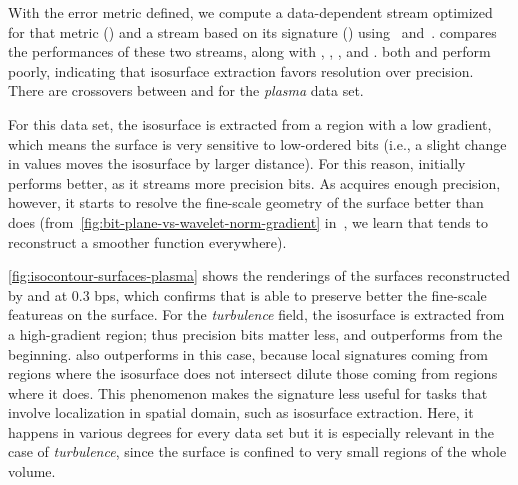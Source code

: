 
With the error metric defined, we compute a data-dependent stream optimized for
that metric (\siop) and a stream based on its signature (\sisg)
using~ and~. 
compares the performances of these two streams, along with \sbit, \slvl, \swav,
and \smag.  both \slvl and \smag perform poorly,
indicating that isosurface extraction favors resolution over precision. There
are crossovers between \sbit and \swav for the \emph{plasma} data set.

For this data set, the isosurface is extracted from a region with a low
gradient, which means the surface is very sensitive to low-ordered bits (i.e.,
a slight change in values moves the isosurface by larger distance). For this
reason, \swav initially performs better, as it streams more precision bits. As
\sbit acquires enough precision, however, it starts to resolve the fine-scale
geometry of the surface better than \swav does
(from~\autoref{fig:bit-plane-vs-wavelet-norm-gradient} in~,
we learn that \swav tends to reconstruct a smoother function everywhere).

\autoref{fig:isocontour-surfaces-plasma} shows the renderings of the surfaces
reconstructed by \sbit and \swav at 0.3 bps, which confirms that \sbit is able
to preserve better the fine-scale featureas on the surface. For the
\emph{turbulence} field, the isosurface is extracted from a high-gradient
region; thus precision bits matter less, and \sbit outperforms \swav from the
beginning. \sbit also outperforms \sisg in this case, because local signatures
coming from regions where the isosurface does not intersect
 dilute those coming from regions where it does. This
phenomenon makes the signature less useful for tasks that involve localization
in spatial domain, such as isosurface extraction. Here, it happens in various
degrees for every data set but it is especially relevant in the case of
\emph{turbulence}, since the surface is confined to very small regions of the
whole volume.

